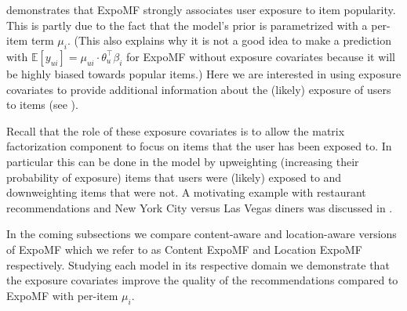 
 demonstrates that ExpoMF strongly associates user exposure to item popularity. This is partly due to the fact that the
model's prior is parametrized with a per-item term $\mu_i$. 
(This also explains why it is not a good idea to make a prediction with $\mathbb{E}[y_{ui}] = \mu_{ui} \cdot \theta_u^\top\beta_i$ for ExpoMF without exposure covariates because it will be highly biased towards popular items.)  
Here we are interested in using exposure covariates to provide additional
information about the (likely) exposure of users to items (see
). 

Recall that the role of these exposure covariates
is to allow the matrix factorization component to focus on items that the user has been exposed to. In particular this can be done
in the model by upweighting (increasing their probability of exposure)
items that users were (likely) exposed to and downweighting items that
were not. A motivating example with restaurant recommendations and New York
City versus Las Vegas diners was discussed in .



In the coming subsections we compare content-aware and location-aware
versions of ExpoMF which we refer to as Content ExpoMF and Location ExpoMF
respectively. Studying each model in its respective domain we demonstrate
that the exposure covariates improve the quality of the recommendations
compared to ExpoMF with per-item $\mu_i$.

